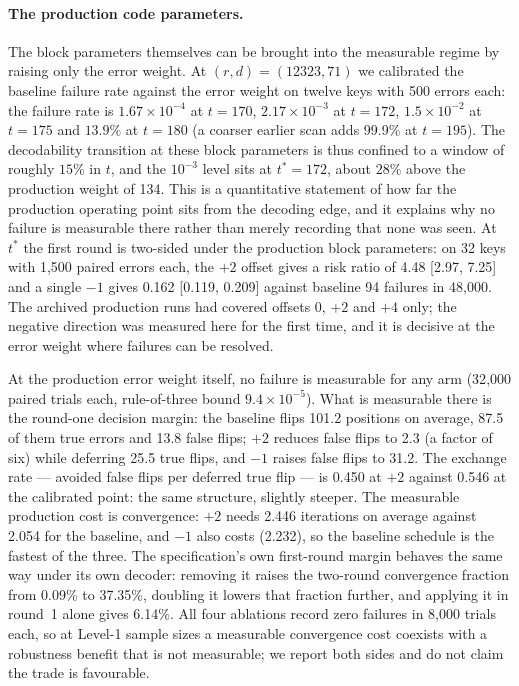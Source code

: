 \documentclass[lettersize,journal]{IEEEtran}
\begin{document}
\paragraph{The production code parameters.} The block parameters themselves can be brought into the measurable regime by raising only the error weight. At $(r,d)=(12323,71)$ we calibrated the baseline failure rate against the error weight on twelve keys with 500 errors each: the failure rate is $1.67\times10^{-4}$ at $t=170$, $2.17\times10^{-3}$ at $t=172$, $1.5\times10^{-2}$ at $t=175$ and $13.9\%$ at $t=180$ (a coarser earlier scan adds 99.9\% at $t=195$). The decodability transition at these block parameters is thus confined to a window of roughly $15\%$ in $t$, and the $10^{-3}$ level sits at $t^{\ast}=172$, about $28\%$ above the production weight of 134. This is a quantitative statement of how far the production operating point sits from the decoding edge, and it explains why no failure is measurable there rather than merely recording that none was seen. At $t^{\ast}$ the first round is two-sided under the production block parameters: on 32 keys with 1{,}500 paired errors each, the $+2$ offset gives a risk ratio of 4.48 [2.97, 7.25] and a single $-1$ gives 0.162 [0.119, 0.209] against baseline 94 failures in 48{,}000. The archived production runs had covered offsets $0$, $+2$ and $+4$ only; the negative direction was measured here for the first time, and it is decisive at the error weight where failures can be resolved.

At the production error weight itself, no failure is measurable for any arm (32{,}000 paired trials each, rule-of-three bound $9.4\times10^{-5}$). What is measurable there is the round-one decision margin: the baseline flips 101.2 positions on average, 87.5 of them true errors and 13.8 false flips; $+2$ reduces false flips to 2.3 (a factor of six) while deferring 25.5 true flips, and $-1$ raises false flips to 31.2. The exchange rate --- avoided false flips per deferred true flip --- is 0.450 at $+2$ against 0.546 at the calibrated point: the same structure, slightly steeper. The measurable production cost is convergence: $+2$ needs 2.446 iterations on average against 2.054 for the baseline, and $-1$ also costs (2.232), so the baseline schedule is the fastest of the three. The specification's own first-round margin behaves the same way under its own decoder: removing it raises the two-round convergence fraction from 0.09\% to 37.35\%, doubling it lowers that fraction further, and applying it in round~1 alone gives 6.14\%. All four ablations record zero failures in 8{,}000 trials each, so at Level-1 sample sizes a measurable convergence cost coexists with a robustness benefit that is not measurable; we report both sides and do not claim the trade is favourable.
\end{document}
